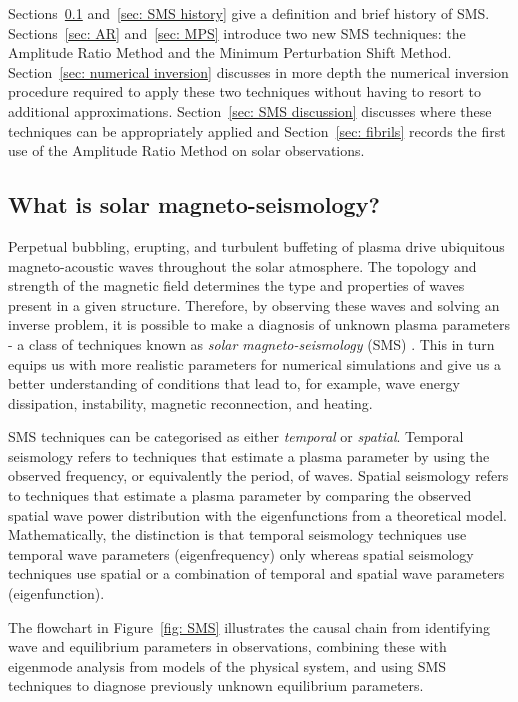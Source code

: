 \documentclass[12pt]{../style-files/ociamthesis}
\begin{document}
Sections~\ref{sec: what is SMS} and~\ref{sec: SMS history} give a definition and brief history of SMS. Sections~\ref{sec: AR} and~\ref{sec: MPS} introduce two new SMS techniques: the Amplitude Ratio Method and the Minimum Perturbation Shift Method. Section~\ref{sec: numerical inversion} discusses in more depth the numerical inversion procedure required to apply these two techniques without having to resort to additional approximations. Section~\ref{sec: SMS discussion} discusses where these techniques can be appropriately applied and Section~\ref{sec: fibrils} records the first use of the Amplitude Ratio Method on solar observations.


\subsection{What is solar magneto-seismology?} \label{sec: what is SMS}

Perpetual bubbling, erupting, and turbulent buffeting of plasma drive ubiquitous magneto-acoustic waves throughout the solar atmosphere. The topology and strength of the magnetic field determines the type and properties of waves present in a given structure. Therefore, by observing these waves and solving an inverse problem, it is possible to make a diagnosis of unknown plasma parameters - a class of techniques known as \textit{solar magneto-seismology} (SMS) \citep{and_etal09,arr12,dem_etal12}. This in turn equips us with more realistic parameters for numerical simulations and give us a better understanding of conditions that lead to, for example, wave energy dissipation, instability, magnetic reconnection, and heating.

SMS techniques can be categorised as either \textit{temporal} or \textit{spatial}. Temporal seismology refers to techniques that estimate a plasma parameter by using the observed frequency, or equivalently the period, of waves. Spatial seismology refers to techniques that estimate a plasma parameter by comparing the observed spatial wave power distribution with the eigenfunctions from a theoretical model. Mathematically, the distinction is that temporal seismology techniques use temporal wave parameters (eigenfrequency) only whereas spatial seismology techniques use spatial or a combination of temporal and spatial wave parameters (eigenfunction).

The flowchart in Figure~\ref{fig: SMS} illustrates the causal chain from identifying wave and equilibrium parameters in observations, combining these with eigenmode analysis from models of the physical system, and using SMS techniques to diagnose previously unknown equilibrium parameters.
\end{document}
